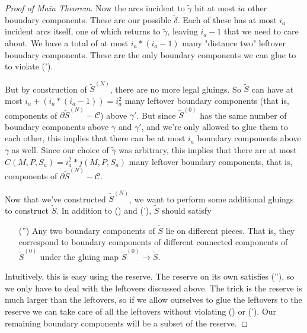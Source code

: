 \documentclass[12pt]{amsart}
\theoremstyle{definition}
\theoremstyle{remark}
\newcommand{\bd}{\partial}
\newcommand{\cC}{\mathcal{C}}
\begin{document}
\begin{proof}[Proof of Main Theorem]
Now the arcs incident to $\widetilde{\gamma}$ hit at most $ia$ other boundary
components. These are our possible $\widetilde{\delta}$. Each of these has at
most $i_a$ incident arcs itself, one of which returns to $\widetilde{\gamma}$,
leaving $i_a-1$ that we need to care about. We have a total of at most
$i_a*(i_a-1)$ many "distance two" leftover boundary components. These are the
only boundary components we can glue to to violate (\dag').

But by construction of $\widetilde{S}^{(N)}$, there are no more legal gluings. So
$\widetilde{S}$ can have at most $i_a+(i_a*(i_a-1)) = i_a^2$ many leftover boundary
components (that is, components of $\bd\widetilde{S}^{(N)}-\cC$) above $\gamma'$.  But since
$\widetilde{S}^{(0)}$ has the same number of boundary components above $\gamma$ and
$\gamma'$, and we're only allowed to glue them to each other, this implies that
there can be at most $i_a$ boundary components above $\gamma$ as well.  Since
our choice of $\widetilde{\gamma}$ was arbitrary, this implies that there are
at most $C(M,P,S_a) = i_a^2*j(M,P,S_a)$ many leftover boundary components, that
is, components of $\bd\widetilde{S}^{(N)}-\cC$.


Now that we've constructed $\widetilde{S}^{(N)}$, we want to perform some additional
gluings to construct $\widetilde{S}$. In addition to (\dag) and (\dag'), $\widetilde{S}$ should
satisfy

\begin{enumerate}

\item[(\dag'')] Any two boundary components of $\widetilde{S}$ lie on different
pieces. That is, they correspond to boundary components of different connected
components of $\widetilde{S}^{(0)}$ under the gluing map $\widetilde{S}^{(0)}
\to \widetilde{S}$.

\end{enumerate}

Intuitively, this is easy using the reserve. The reserve on its own satisfies
(\dag''), so we only have to deal with the leftovers discussed above.  The trick
is the reserve is much larger than the leftovers, so if we allow ourselves to
glue the leftovers to the reserve we can take care of all the leftovers without
violating (\dag) or (\dag'). Our remaining boundary components will be a subset
of the reserve.


\end{proof}
\end{document}
